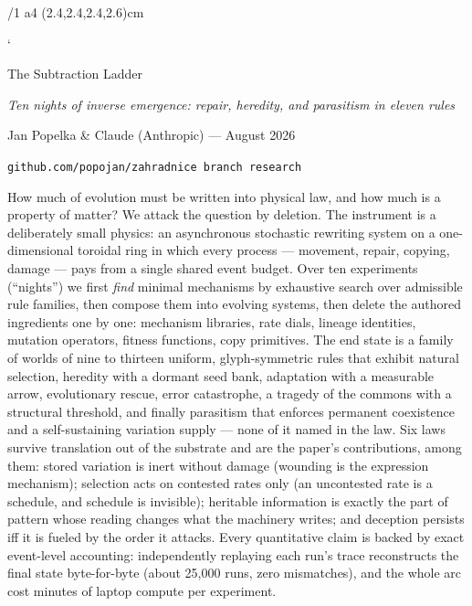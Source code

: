 \fontfam[Equity]
\hyperlinks \Blue \Blue
\report
\margins/1 a4 (2.4,2.4,2.4,2.6)cm
\typosize[11/13.8]

\def\repo#1{{\tt #1}}
\def\lawname#1{{\bf #1.}}
\def\g#1{{\tt #1}}
\verbchar`

\tit The Subtraction Ladder

\centerline{\it Ten nights of inverse emergence: repair, heredity,
and parasitism in eleven rules}
\medskip
\centerline{Jan Popelka \& Claude (Anthropic) --- August 2026}
\centerline{\tt github.com/popojan/zahradnice \quad branch {\tt research}
\quad \repo{experiments/inverse/}}
\bigskip

How much of evolution must be written into physical law, and how
much is a property of matter? We attack the question by deletion. The
instrument is a deliberately small physics: an asynchronous
stochastic rewriting system on a one-dimensional toroidal ring in
which every process --- movement, repair, copying, damage --- pays
from a single shared event budget. Over ten experiments (“nights”)
we first {\it find} minimal mechanisms by exhaustive search over
admissible rule families, then compose them into evolving systems,
then delete the authored ingredients one by one: mechanism
libraries, rate dials, lineage identities, mutation operators,
fitness functions, copy primitives. The end state is a family of
worlds of nine to thirteen uniform, glyph-symmetric rules that
exhibit natural selection, heredity with a dormant seed bank,
adaptation with a measurable arrow, evolutionary rescue, error
catastrophe, a tragedy of the commons with a structural threshold,
and finally parasitism that enforces permanent coexistence and a
self-sustaining variation supply --- none of it named in the law.
Six laws survive translation out of the substrate and are the
paper's contributions, among them: stored variation is inert without
damage (wounding is the expression mechanism); selection acts on
contested rates only (an uncontested rate is a schedule, and
schedule is invisible); heritable information is exactly the part
of pattern whose reading changes what the machinery writes; and
deception persists iff it is fueled by the order it attacks. Every
quantitative claim is backed by exact event-level accounting:
independently replaying each run's trace reconstructs the final
state byte-for-byte (about 25{,}000 runs, zero mismatches), and the
whole arc cost minutes of laptop compute per experiment.

